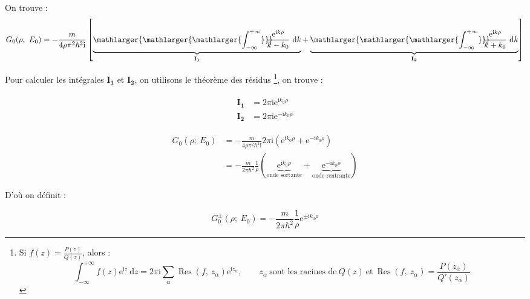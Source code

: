 \documentclass[12pt,a4paper,oneside,french]{book}
\renewcommand{\i}{\mathrm{i}}
\newcommand{\e}{\mathrm{e}}
\newcommand{\diff}{\mathrm{d}}
\newcommand{\Bigint}[2]{\mathop{\mathlarger{\mathlarger{\mathlarger{\int_{#1}^{#2}}}}}}
\newcommand{\removeintspace}{\!\!\!\!\!\!\!\!}
\DeclareMathOperator*{\res}{Res}
\theoremstyle{definition}
\theoremstyle{definition}
\theoremstyle{definition}
\theoremstyle{remark}
\theoremstyle{definition}
\begin{document}
    \bigskip
    
    On trouve :
    \begin{equation*}
        {G}_{0}(\rho; \ {E}_{0}) = - \frac{m}{4 \rho {\pi}^{2} {\hbar}^{2} \i} \left[\underbrace{\Bigint{-\infty}{+\infty} \removeintspace \ \frac{{\e}^{\i k \rho}}{k - {k}_{0}} \ \diff k}_{\mathbf{I_1}} + \underbrace{\Bigint{-\infty}{+\infty} \removeintspace \ \frac{{\e}^{\i k \rho}}{k + {k}_{0}} \ \diff k}_{\mathbf{I_2}}\right]
    \end{equation*}
    
    Pour calculer les intégrales $\mathbf{I_1}$ et $\mathbf{I_2}$, on utilisons le théorème des résidus \footnote{Si $f(z) = \frac{P(z)}{Q(z)}$, alors :
        \begin{equation*}
            \int_{-\infty}^{+\infty} f(z) {\e}^{\i z} \ \diff z = 2\pi\i {\sum}_{\alpha} \res(f, \ {z}_{\alpha}) {\e}^{\i {z}_{\alpha}}, \qquad {z}_{\alpha} \ \text{sont les racines de} \ Q(z) \ \text{et} \ \res(f, \ {z}_{\alpha}) = \frac{P({z}_{\alpha})}{Q'({z}_{\alpha})}
        \end{equation*}}, on trouve :
        
    \begin{align*}
    \begin{split}
        \mathbf{I_1} &= 2\pi\i {\e}^{\i {k}_{0} \rho} \\
        \mathbf{I_2} &= 2\pi\i {\e}^{-\i {k}_{0} \rho}
    \end{split}
    \end{align*}
    
    \begin{equation*}
    \begin{split}
        {G}_{0}(\rho; \ {E}_{0})
            &= -\frac{m}{4 \rho {\pi}^{2} {\hbar}^{2} \i} 2\pi\i \left({\e}^{\i {k}_{0} \rho} + {\e}^{-\i {k}_{0} \rho}\right) \\
            &= -\frac{m}{2\pi {\hbar}^{2}} \frac{1}{\rho} \left(\underbrace{{\e}^{\i {k}_{0} \rho}}_{\text{onde sortante}} + \underbrace{{\e}^{-\i {k}_{0} \rho}}_{\text{onde rentrante}}\right)
    \end{split}
    \end{equation*}
    
    D'où on définit :
    
    \begin{equation} \label{chap3_eq/14}
        {G}_{0}^{\pm}(\rho; \ {E}_{0}) = -\frac{m}{2\pi {\hbar}^{2}} \frac{1}{\rho} {\e}^{\pm\i {k}_{0} \rho}
    \end{equation}
    
\end{document}
